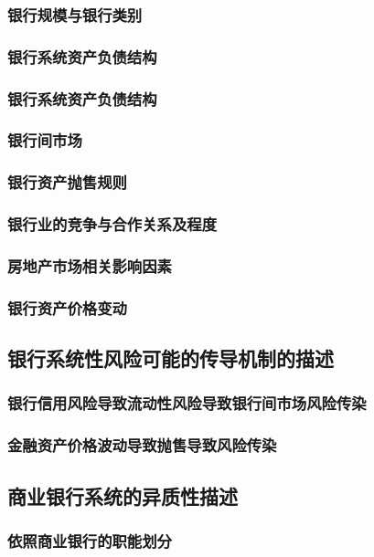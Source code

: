 \subsubsection{银行规模与银行类别}
\subsubsection{银行系统资产负债结构}
\subsubsection{银行系统资产负债结构}
\subsubsection{银行间市场}
\subsubsection{银行资产抛售规则}
\subsubsection{银行业的竞争与合作关系及程度}
\subsubsection{房地产市场相关影响因素}
\subsubsection{银行资产价格变动}

\newpage
\subsection{银行系统性风险可能的传导机制的描述}

\subsubsection{银行信用风险导致流动性风险导致银行间市场风险传染}
\subsubsection{金融资产价格波动导致抛售导致风险传染}

\newpage
\subsection{商业银行系统的异质性描述}

\subsubsection{依照商业银行的职能划分}
